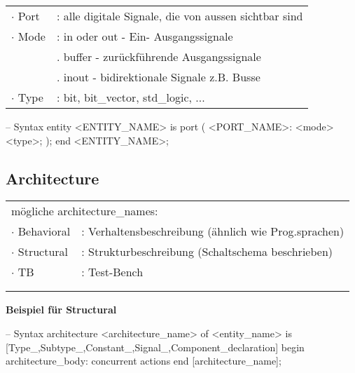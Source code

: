\begin{minipage}{0.519\textwidth}
	\begin{tabular}{l l}
		$\cdot$ Port 	& : alle digitale Signale, die von aussen sichtbar sind\\
		$\cdot$ Mode	& : in oder out - Ein- Ausgangssignale\\
						& . buffer - zurückführende Ausgangssignale\\
						& . inout - bidirektionale Signale z.B. Busse\\
		$\cdot$ Type 	& : bit, bit\_vector, std\_logic, ... \\
\end{tabular}
\end{minipage}
\begin{minipage}{0.48\textwidth}
	\begin{VHDL}
-- Syntax
entity <ENTITY_NAME> is
	port (
		{<PORT_NAME>: <mode> <type>;}
	);
end <ENTITY_NAME>;	
	\end{VHDL}
\end{minipage}
\subsection{Architecture}

\begin{minipage}{0.519\textwidth}
	\begin{tabular}{l l}
		\multicolumn{2}{l}{	mögliche architecture\_names:} \\
		$\cdot$ Behavioral 	& : Verhaltensbeschreibung {\tiny(ähnlich wie Prog.sprachen)}\\
		$\cdot$ Structural	& : Strukturbeschreibung {\tiny(Schaltschema beschrieben)}\\
		$\cdot$ TB 			& : Test-Bench \\
		& \\
		& \\
\end{tabular}


\textbf{Beispiel für Structural}

\end{minipage}
\begin{minipage}{0.48\textwidth}
	\begin{VHDL}
-- Syntax
architecture <architecture_name> of <entity_name> is
	[Type_,Subtype_,Constant_,Signal_,Component_declaration]
begin
	{architecture_body: concurrent actions}
end [architecture_name];	
	\end{VHDL}
\end{minipage}

